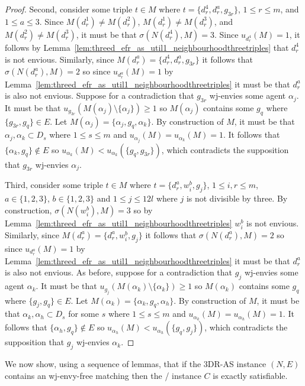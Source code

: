 \begin{proof}
Second, consider some triple $t\in M$ where $t=\{ d_r^4, d_r^a, g_{3r} \}$, $1\leq r\leq m$, and $1\leq a \leq 3$. Since $M(d_r^1)\neq M(d_r^2)$, $M(d_r^1)\neq M(d_r^3)$, and $M(d_r^2)\neq M(d_r^3)$, it must be that $\sigma(N(d_r^4), M)=3$. Since $u_{d_r^4}(M)=1$, it follows by Lemma~\ref{lem:threed_efr_as_util1_neighbourhoodthreetriples} that $d_r^4$ is not envious. Similarly, since $M(d_r^a)=\{ d_r^4, d_r^a, g_{3r} \}$ it follows that $\sigma(N(d_r^a), M)=2$ so since $u_{d_r^a}(M)=1$ by Lemma~\ref{lem:threed_efr_as_util1_neighbourhoodthreetriples} it must be that $d_r^a$ is also not envious. Suppose for a contradiction that $g_{3r}$ wj-envies some agent $\alpha_j$. It must be that $u_{g_{3r}}(M(\alpha_j) \setminus \{ \alpha_j \})\geq 1$ so $M(\alpha_j)$ contains some $g_q$ where $\{ g_{3r}, g_q \} \in E$. Let $M(\alpha_j) = \{ \alpha_j, g_q, \alpha_k \}$. By construction of $M$, it must be that $\alpha_j, \alpha_k \subset D_s$ where $1\leq s\leq m$ and $u_{\alpha_j}(M)=u_{\alpha_k}(M)=1$. It follows that $\{ \alpha_k, g_q \} \notin E$ so $u_{\alpha_k}(M) < u_{\alpha_k}(\{ g_q, g_{3r} \})$, which contradicts the supposition that $g_{3r}$ wj-envies $\alpha_j$.

Third, consider some triple $t\in M$ where $t=\{ d_r^a, w_i^b, g_j \}$,  $1\leq i, r \leq m$, $a \in \{1, 2, 3 \}$, $b \in \{ 1, 2, 3 \}$ and $1\leq j\leq 12l$ where $j$ is not divisible by three. By construction, $\sigma(N(w_i^b), M)=3$ so by Lemma~\ref{lem:threed_efr_as_util1_neighbourhoodthreetriples} $w_i^b$ is not envious. Similarly, since $M(d_r^a)=\{ d_r^a, w_i^b, g_{j} \}$ it follows that $\sigma(N(d_r^a), M)=2$ so since $u_{d_r^a}(M)=1$ by Lemma~\ref{lem:threed_efr_as_util1_neighbourhoodthreetriples} it must be that $d_r^a$ is also not envious. As before, suppose for a contradiction that $g_{j}$ wj-envies some agent $\alpha_k$. It must be that $u_{g_{j}}(M(\alpha_k) \setminus \{ \alpha_k \})\geq 1$ so $M(\alpha_k)$ contains some $g_q$ where $\{ g_{j}, g_q \} \in E$. Let $M(\alpha_k) = \{ \alpha_k, g_q, \alpha_h \}$. By construction of $M$, it must be that $\alpha_k, \alpha_h \subset D_s$ for some $s$ where $1\leq s\leq m$ and $u_{\alpha_k}(M)=u_{\alpha_h}(M)=1$. It follows that $\{ \alpha_h, g_q \} \notin E$ so $u_{\alpha_h}(M) < u_{\alpha_h}(\{ g_q, g_{j} \})$, which contradicts the supposition that $g_{j}$ wj-envies $\alpha_k$.
\end{proof}

We now show, using a sequence of lemmas, that if the 3DR-AS instance $(N, E)$ contains an wj-envy-free matching then the \porschenxsatvariant/ instance $C$ is exactly satisfiable.

